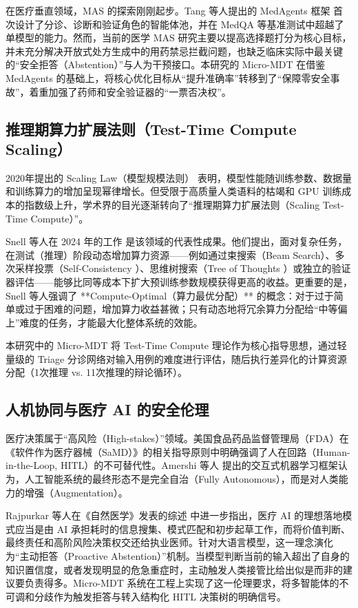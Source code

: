 \documentclass[11pt,a4paper]{ctexart}
\begin{document}
在医疗垂直领域，MAS 的探索刚刚起步。Tang 等人提出的 MedAgents 框架 \cite{tang2024medagents} 首次设计了分诊、诊断和验证角色的智能体池，并在 MedQA 等基准测试中超越了单模型的能力。然而，当前的医学 MAS 研究主要以提高选择题打分为核心目标，并未充分解决开放式处方生成中的用药禁忌拦截问题，也缺乏临床实际中最关键的“安全拒答（Abstention）”与人为干预接口。本研究的 Micro-MDT 在借鉴 MedAgents 的基础上，将核心优化目标从“提升准确率”转移到了“保障零安全事故”，着重加强了药师和安全验证器的“一票否决权”。

\subsection{推理期算力扩展法则（Test-Time Compute Scaling）}

2020年提出的 Scaling Law（模型规模法则） \cite{kaplan2020scaling} 表明，模型性能随训练参数、数据量和训练算力的增加呈现幂律增长。但受限于高质量人类语料的枯竭和 GPU 训练成本的指数级上升，学术界的目光逐渐转向了“推理期算力扩展法则（Scaling Test-Time Compute）”。

Snell 等人在 2024 年的工作 \cite{snell2024scaling} 是该领域的代表性成果。他们提出，面对复杂任务，在测试（推理）阶段动态增加算力资源——例如通过束搜索（Beam Search）、多次采样投票（Self-Consistency \cite{wang2023self}）、思维树搜索（Tree of Thoughts \cite{yao2024tree}）或独立的验证器评估——能够比同等成本下扩大预训练参数规模获得更高的收益。更重要的是，Snell 等人强调了 **Compute-Optimal（算力最优分配）** 的概念：对于过于简单或过于困难的问题，增加算力收益甚微；只有动态地将冗余算力分配给“中等偏上”难度的任务，才能最大化整体系统的效能。

本研究中的 Micro-MDT 将 Test-Time Compute 理论作为核心指导思想，通过轻量级的 Triage 分诊网络对输入用例的难度进行评估，随后执行差异化的计算资源分配（1次推理 vs. 11次推理的辩论循环）。

\subsection{人机协同与医疗 AI 的安全伦理}

医疗决策属于“高风险（High-stakes）”领域。美国食品药品监督管理局（FDA）在《软件作为医疗器械（SaMD）》的相关指导原则中明确强调了人在回路（Human-in-the-Loop, HITL）的不可替代性。Amershi 等人 \cite{amershi2014power} 提出的交互式机器学习框架认为，人工智能系统的最终形态不是完全自治（Fully Autonomous），而是对人类能力的增强（Augmentation）。

Rajpurkar 等人在《自然医学》发表的综述 \cite{rajpurkar2022ai} 中进一步指出，医疗 AI 的理想落地模式应当是由 AI 承担耗时的信息搜集、模式匹配和初步起草工作，而将价值判断、最终责任和高阶风险决策权交还给执业医师。针对大语言模型，这一理念演化为“主动拒答（Proactive Abstention）”机制。当模型判断当前的输入超出了自身的知识置信度，或者发现明显的危急重症时，主动触发人类接管比给出似是而非的建议要负责得多。Micro-MDT 系统在工程上实现了这一伦理要求，将多智能体的不可调和分歧作为触发拒答与转入结构化 HITL 决策树的明确信号。
\end{document}
